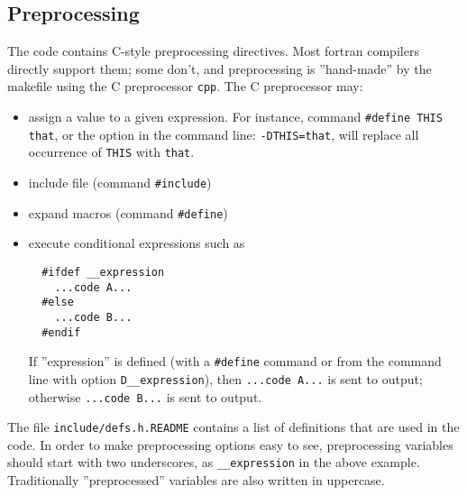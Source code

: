 \documentclass[12pt,a4paper]{article}
\begin{document}
\subsection{Preprocessing}
\label{SubSec:CPP}
The code contains C-style preprocessing directives. Most fortran compilers directly support them; some don't, and preprocessing is ''hand-made'' by the makefile using the C preprocessor \texttt{cpp}. The C preprocessor may:
\begin{itemize}
\item assign a value to a given expression. For instance, command \texttt{\#define THIS that}, or the option in the command line: \texttt{-DTHIS=that}, will replace all occurrence of \texttt{THIS} with \texttt{that}.
\item include file (command \texttt{\#include})
\item expand macros (command \texttt{\#define})
\item execute conditional expressions such as
\begin{verbatim}
  #ifdef __expression
    ...code A...
  #else
    ...code B...
  #endif
\end{verbatim}
If ''expression'' is defined (with a \texttt{\#define} command 
or from the command line with option \texttt{\-D\_\_expression}), 
then  \texttt{...code A...} is sent to output; otherwise 
\texttt{...code B...} is sent to output.

\end{itemize}
The file \texttt{include/defs.h.README} contains a list of definitions that are used in the code. In order to make  preprocessing options easy to see, preprocessing variables should start with 
two underscores, as \texttt{\_\_expression} in the above example. Traditionally ''preprocessed'' variables are also written in uppercase.

\end{document}
